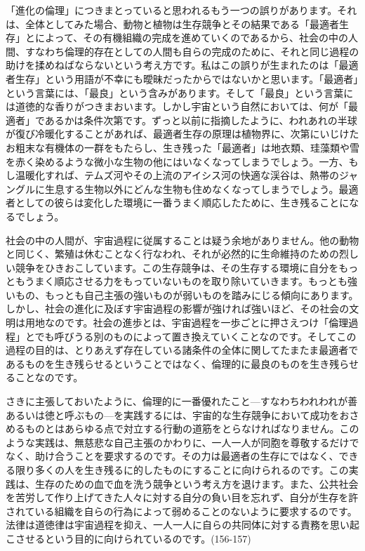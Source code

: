 「進化の倫理」につきまとっていると思われるもう一つの誤りがあります。それは、全体としてみた場合、動物と植物は生存競争とその結果である「最適者生存」とによって、その有機組織の完成を進めていくのであるから、社会の中の人間、すなわち倫理的存在としての人間も自らの完成のために、それと同じ過程の助けを揉めねばならないという考え方です。私はこの誤りが生まれたのは「最適者生存」という用語が不幸にも曖昧だったからではないかと思います。「最適者」という言葉には、「最良」という含みがあります。そして「最良」という言葉には道徳的な香りがつきまおいます。しかし宇宙という自然においては、何が「最適者」であるかは条件次第です。ずっと以前に指摘したように、われあれの半球が復び冷暖化することがあれば、最適者生存の原理は植物界に、次第にいじけたお粗末な有機体の一群をもたらし、生き残った「最適者」は地衣類、珪藻類や雪を赤く染めるような微小な生物の他にはいなくなってしまうでしょう。一方、もし温暖化すれば、テムズ河やその上流のアイシス河の快適な渓谷は、熱帯のジャングルに生息する生物以外にどんな生物も住めなくなってしまうでしょう。最適者としての彼らは変化した環境に一番うまく順応したために、生き残ることになるでしょう。

社会の中の人間が、宇宙過程に従属することは疑う余地がありません。他の動物と同じく、繁殖は休むことなく行なわれ、それが必然的に生命維持のための烈しい競争をひきおこしています。この生存競争は、その生存する環境に自分をもっともうまく順応させる力をもっていないものを取り除いていきます。もっとも強いもの、もっとも自己主張の強いものが弱いものを踏みにじる傾向にあります。しかし、社会の進化に及ぼす宇宙過程の影響が強ければ強いほど、その社会の文明は用地なのです。社会の進歩とは、宇宙過程を一歩ごとに押さえつけ「倫理過程」とでも呼びうる別のものによって置き換えていくことなのです。そしてこの過程の目的は、とりあえず存在している諸条件の全体に関してたまたま最適者であるものを生き残らせるということではなく、倫理的に最良のものを生き残らせることなのです。

さきに主張しておいたように、倫理的に一番優れたこと{\——}すなわちわれわれが善あるいは徳と呼ぶもの{\——}を実践するには、宇宙的な生存競争において成功をおさめるものとはあらゆる点で対立する行動の道筋をとらなければなりません。このような実践は、無慈悲な自己主張のかわりに、一人一人が同胞を尊敬するだけでなく、助け合うことを要求するのです。その力は最適者の生存にではなく、できる限り多くの人を生き残るに的したものにすることに向けられるのです。この実践は、生存のための血で血を洗う競争という考え方を退けます。また、公共社会を苦労して作り上げてきた人々に対する自分の負い目を忘れず、自分が生存を許されている組織を自らの行為によって弱めることのないように要求するのです。法律は道徳律は宇宙過程を抑え、一人一人に自らの共同体に対する責務を思い起こさせるという目的に向けられているのです。(156-157)



